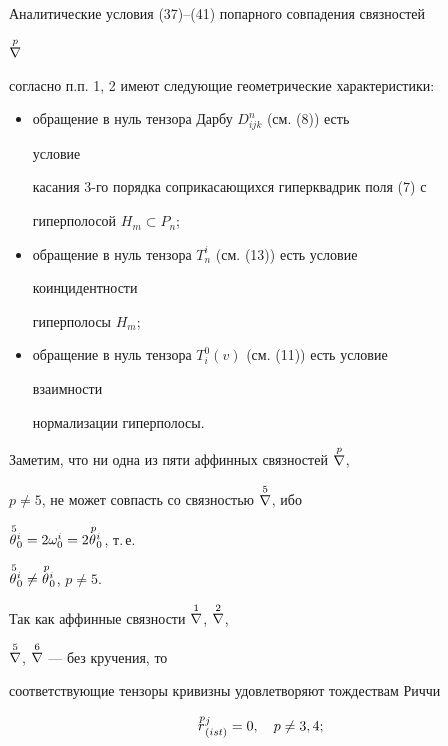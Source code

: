  


Аналитические условия (37)--(41) попарного совпадения связностей 


$\overset{p}{\nabla}{}$ 


согласно п.п. 1, 2 имеют следующие геометрические характеристики: 


\begin{itemize} 


\item[---] обращение в нуль тензора Дарбу $D^n_{i j k}$ (см. (8)) есть 


условие 


касания 3-го порядка соприкасающихся гиперквадрик поля (7) с 


гиперполосой $H_m\subset P_n$; 


\item[---] обращение в нуль тензора $T^i_n$ (см. (13)) есть условие 


коинцидентности 


гиперполосы $H_m$; 


\item[---] обращение в нуль тензора $T^0_i(v)$ (см. (11)) есть условие 


взаимности 


нормализации гиперполосы. 


\end{itemize} 


 


Заметим, что ни одна из пяти аффинных связностей $\overset{p}{\nabla}{}$, 


$p\ne 5$, не может совпасть со связностью $\overset{5}{\nabla}{}$, ибо 


$\overset{\,5}{\theta}{}^i_0=2\omega^i_0=2\overset{\,p}{\theta}{}^i_0$, т.\,е. 


$\overset{\,5}{\theta}{}^i_0\ne\overset{\,p}{\theta}{}^i_0$, $p\ne 5$. 


 


Так как аффинные связности $\overset{1}{\nabla}{}$, $\overset{2}{\nabla}{}$, 


$\overset{5}{\nabla}{}$, $\overset{6}{\nabla}{}$ --- без кручения, то 


соответствующие тензоры кривизны удовлетворяют тождествам Риччи 


\begin{equation} 


\up{\,p}{r}^j_{(is t)}=0,\quad p\ne 3,4; 


\end{equation} 


